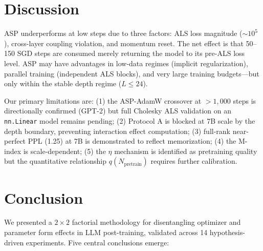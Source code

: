 \documentclass[11pt]{article}
\begin{document}
\section{Discussion}

ASP underperforms at low steps due to three factors: ALS loss magnitude ($\sim10^5$), cross-layer coupling violation, and momentum reset. The net effect is that 50--150 SGD steps are consumed merely returning the model to its pre-ALS loss level. ASP may have advantages in low-data regimes (implicit regularization), parallel training (independent ALS blocks), and very large training budgets---but only within the stable depth regime ($L \leq 24$).

Our primary limitations are: (1) the ASP-AdamW crossover at $>1,000$ steps is directionally confirmed (GPT-2) but full Cholesky ALS validation on an \texttt{nn.Linear} model remains pending; (2) Protocol A is blocked at 7B scale by the depth boundary, preventing interaction effect computation; (3) full-rank near-perfect PPL (1.25) at 7B is demonstrated to reflect memorization; (4) the M-index is scale-dependent; (5) the $\eta$ mechanism is identified as pretraining quality but the quantitative relationship $q(N_{\text{pretrain}})$ requires further calibration.

\section{Conclusion}

We presented a $2\times2$ factorial methodology for disentangling optimizer and parameter form effects in LLM post-training, validated across 14 hypothesis-driven experiments. Five central conclusions emerge:
\end{document}
